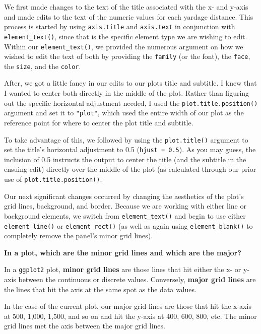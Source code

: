 \documentclass[
  letterpaper,
]{krantz}
\begin{document}
We first made changes to the text of the title associated with the x-
and y-axis and made edits to the text of the numeric values for each
yardage distance. This process is started by using \texttt{axis.title}
and \texttt{axis.text} in conjunction with \texttt{element\_text()},
since that is the specific element type we are wishing to edit. Within
our \texttt{element\_text()}, we provided the numerous argument on how
we wished to edit the text of both by providing the \texttt{family} (or
the font), the \texttt{face}, the \texttt{size}, and the \texttt{color}.

After, we got a little fancy in our edits to our plots title and
subtitle. I knew that I wanted to center both directly in the middle of
the plot. Rather than figuring out the specific horizontal adjustment
needed, I used the \texttt{plot.title.position()} argument and set it to
\texttt{"plot"}, which used the entire width of our plot as the
reference point for where to center the plot title and subtitle.

To take advantage of this, we followed by using the
\texttt{plot.title()} argument to set the title's horizontal adjustment
to 0.5 (\texttt{hjust\ =\ 0.5}). As you may guess, the inclusion of 0.5
instructs the output to center the title (and the subtitle in the
ensuing edit) directly over the middle of the plot (as calculated
through our prior use of \texttt{plot.title.position()}.

Our next significant changes occurred by changing the aesthetics of the
plot's grid lines, background, and border. Because we are working with
either line or background elements, we switch from
\texttt{element\_text()} and begin to use either
\texttt{element\_line()} or \texttt{element\_rect()} (as well as again
using \texttt{element\_blank()} to completely remove the panel's minor
grid lines).

\begin{tcolorbox}[enhanced jigsaw, colback=white, leftrule=.75mm, breakable, colframe=quarto-callout-tip-color-frame, bottomtitle=1mm, rightrule=.15mm, left=2mm, opacityback=0, bottomrule=.15mm, arc=.35mm, coltitle=black, colbacktitle=quarto-callout-tip-color!10!white, toptitle=1mm, titlerule=0mm, title=\textcolor{quarto-callout-tip-color}{\faLightbulb}\hspace{0.5em}{Tip}, toprule=.15mm, opacitybacktitle=0.6]

\textbf{In a plot, which are the minor grid lines and which are the
major?}

In a \texttt{ggplot2} plot, \textbf{minor grid lines} are those lines
that hit either the x- or y-axis between the continuous or discrete
values. Conversely, \textbf{major grid lines} are the lines that hit the
axis at the same spot as the data values.

In the case of the current plot, our major grid lines are those that hit
the x-axis at 500, 1,000, 1,500, and so on and hit the y-axis at 400,
600, 800, etc. The minor grid lines met the axis between the major grid
lines.

\end{tcolorbox}
\end{document}
